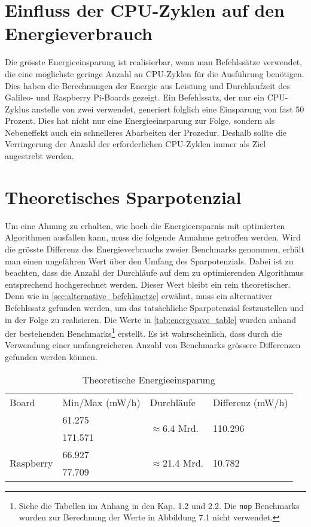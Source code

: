 \section{Einfluss der CPU-Zyklen auf den Energieverbrauch}
Die grösste Energieeinsparung ist realisierbar, wenn man Befehlssätze verwendet, die eine möglichste geringe Anzahl an CPU-Zyklen für die Ausführung benötigen. Dies haben die Berechnungen der Energie aus Leistung und Durchlaufzeit   des Galileo- und Raspberry Pi-Boards gezeigt. Ein Befehlssatz, der nur ein CPU-Zyklus anstelle von zwei verwendet, generiert folglich eine Einsparung von fast 50 Prozent. Dies hat nicht nur eine Energieeinsparung zur Folge, sondern als Nebeneffekt auch ein schnelleres Abarbeiten der Prozedur. Deshalb sollte die Verringerung der Anzahl der erforderlichen CPU-Zyklen immer als Ziel angestrebt werden.

\section{Theoretisches Sparpotenzial}
Um eine Ahnung zu erhalten, wie hoch die Energieersparnis mit optimierten Algorithmen ausfallen kann, muss die folgende Annahme getroffen werden. Wird die grösste Differenz des Energieverbrauchs zweier Benchmarks genommen, erhält man einen ungefähren Wert über den Umfang des Sparpotenzials. Dabei ist zu beachten, dass die Anzahl der Durchläufe auf dem zu optimierenden Algorithmus entsprechend hochgerechnet werden. Dieser Wert bleibt ein rein theoretischer. Denn wie in \autoref{sec:alternative_befehlsaetze} erwähnt, muss ein alternativer Befehlssatz gefunden werden, um das tatsächliche Sparpotenzial festzustellen und in der Folge zu realisieren. Die Werte in \autoref{tab:energysave_table} wurden anhand der bestehenden Benchmarks\footnote{Siehe die Tabellen im Anhang in den Kap. 1.2 und 2.2. Die \texttt{nop} Benchmarks wurden zur Berechnung der Werte in Abbildung 7.1 nicht verwendet.} erstellt. Es ist wahrscheinlich, dass durch die Verwendung einer umfangreicheren Anzahl von Benchmarks grössere Differenzen gefunden werden können.


\begin{table}[H]
\center
\begin{tabular}{ |l|l|l|l| }
\hline
Board & Min/Max (mW/h) & Durchläufe & Differenz (mW/h) \\ \hhline{|=|=|=|=|}
\multirow{2}{*}{Galileo} & 61.275 & \multirow{2}{*}{$\approx$6.4 Mrd.} & \multirow{2}{*}{110.296} \\ 
 & 171.571 & &  \\ \hline
\multirow{2}{*}{Raspberry} & 66.927 & \multirow{2}{*}{$\approx$21.4 Mrd.} & \multirow{2}{*}{10.782} \\ 
 & 77.709 & &  \\
\hline
\end{tabular}
\caption{Theoretische Energieeinsparung}
\label{tab:energysave_table}
\end{table}




